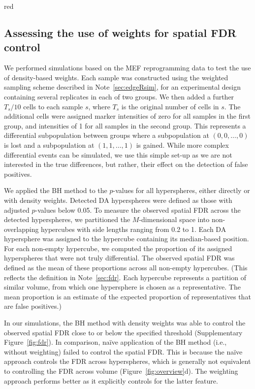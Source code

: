 \documentclass{article}
\begin{document}
\begin{color}{red}
\subsection{Assessing the use of weights for spatial FDR control}
We performed simulations based on the MEF reprogramming data to test the use of density-based weights.
Each sample was constructed using the weighted sampling scheme described in Note~\ref{sec:edgeRsim}, for an experimental design containing several replicates in each of two groups.
We then added a further $T_s/10$ cells to each sample $s$, where $T_s$ is the original number of cells in $s$.
The additional cells were assigned marker intensities of zero for all samples in the first group, and intensities of 1 for all samples in the second group.
This represents a differential subpopulation between groups where a subpopulation at $(0,0, \ldots, 0)$ is lost and a subpopulation at $(1, 1, \ldots, 1)$ is gained.
While more complex differential events can be simulated, we use this simple set-up as we are not interested in the true differences, but rather, their effect on the detection of false positives.

We applied the BH method to the $p$-values for all hyperspheres, either directly or with density weights.
Detected DA hyperspheres were defined as those with adjusted $p$-values below 0.05.
To measure the observed spatial FDR across the detected hyperspheres, we partitioned the $M$-dimensional space into non-overlapping hypercubes with side lengths ranging from 0.2 to 1.
Each DA hypersphere was assigned to the hypercube containing its median-based position.
For each non-empty hypercube, we computed the proportion of its assigned hyperspheres that were not truly differential.
The observed spatial FDR was defined as the mean of these proportions across all non-empty hypercubes.
(This reflects the definition in Note~\ref{sec:fdr}.
Each hypercube represents a partition of similar volume, from which one hypersphere is chosen as a representative.
The mean proportion is an estimate of the expected proportion of representatives that are false positives.)


In our simulations, the BH method with density weights was able to control the observed spatial FDR close to or below the specified threshold (Supplementary Figure~\ref{fig:fdr}).
In comparison, na\"ive application of the BH method (i.e., without weighting) failed to control the spatial FDR.
This is because the na\"ive approach controls the FDR across hyperspheres, which is generally not equivalent to controlling the FDR across volume (Figure~\ref{fig:overview}d).
The weighting approach performs better as it explicitly controls for the latter feature.
\end{color}
\end{document}
